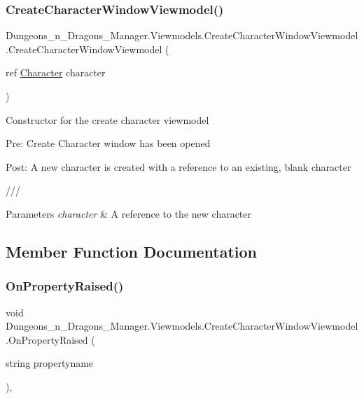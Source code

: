 \subsubsection{\texorpdfstring{Create\+Character\+Window\+Viewmodel()}{CreateCharacterWindowViewmodel()}}
{\footnotesize\ttfamily Dungeons\+\_\+n\+\_\+\+Dragons\+\_\+\+Manager.\+Viewmodels.\+Create\+Character\+Window\+Viewmodel.\+Create\+Character\+Window\+Viewmodel (\begin{DoxyParamCaption}\item[{ref \mbox{\hyperlink{class_dungeons__n___dragons___manager_1_1_models_1_1_character}{Character}}}]{character }\end{DoxyParamCaption})\hspace{0.3cm}{\ttfamily [inline]}}



Constructor for the create character viewmodel 

Pre\+: Create Character window has been opened

Post\+: A new character is created with a reference to an existing, blank character 

/// 
\begin{DoxyParams}{Parameters}
{\em character} & A reference to the new character\\
\hline
\end{DoxyParams}


\subsection{Member Function Documentation}
\mbox{\label{class_dungeons__n___dragons___manager_1_1_viewmodels_1_1_create_character_window_viewmodel_a53f8799bcfdd43bf342dcb14d77b2f82}} 
\subsubsection{\texorpdfstring{On\+Property\+Raised()}{OnPropertyRaised()}}
{\footnotesize\ttfamily void Dungeons\+\_\+n\+\_\+\+Dragons\+\_\+\+Manager.\+Viewmodels.\+Create\+Character\+Window\+Viewmodel.\+On\+Property\+Raised (\begin{DoxyParamCaption}\item[{string}]{propertyname }\end{DoxyParamCaption})\hspace{0.3cm}{\ttfamily [inline]}, {\ttfamily [private]}}



